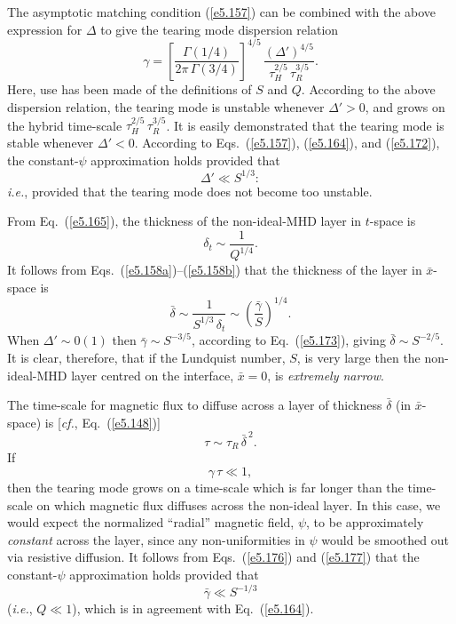 The asymptotic matching condition (\ref{e5.157}) can be combined with the above
expression for ${\Delta}$ to give the tearing mode dispersion relation
\begin{equation}\label{e5.173}
\gamma = \left[\frac{{\Gamma}(1/4)}{2\pi\,{\Gamma}(3/4)}\right]^{4/5}\,
\frac{({\Delta}')^{4/5}}{\tau_H^{2/5}\,\tau_R^{3/5}}.
\end{equation}
Here, use has been made of the definitions of $S$ and $Q$. According
to the above dispersion relation, the tearing mode is unstable whenever ${\Delta}'>0$, and grows on the hybrid time-scale $\tau_H^{2/5}\,\tau_R^{3/5}$. 
It is easily demonstrated that the tearing mode is stable whenever ${\Delta}'<0$.
According to Eqs.~(\ref{e5.157}), (\ref{e5.164}), and (\ref{e5.172}), the constant-$\psi$
approximation holds provided that
\begin{equation}
{\Delta}' \ll S^{1/3}:
\end{equation}
{\em i.e.}, provided that the tearing mode does not become too
unstable.

From  Eq.~(\ref{e5.165}), the thickness of the non-ideal-MHD layer in $t$-space
is
\begin{equation}
\delta_t \sim \frac{1}{Q^{1/4}}.
\end{equation}
It follows from Eqs.~(\ref{e5.158a})--(\ref{e5.158b}) that the thickness of the layer in $\bar{x}$-space
is
\begin{equation}\label{e5.176}
\bar{\delta} \sim \frac{1}{S^{1/3}\,\delta_t} \sim \left(
\frac{\bar{\gamma}}{S}\right)^{1/4}.
\end{equation}
When ${\Delta}'\sim 0(1)$ then $\bar{\gamma}\sim S^{-3/5}$, according to
Eq.~(\ref{e5.173}), giving $\bar{\delta}\sim S^{-2/5}$. It is clear, therefore, that if
the Lundquist number, $S$, is very large then the non-ideal-MHD layer centred
on the interface, $\bar{x}=0$,  is {\em extremely narrow}.

The time-scale for magnetic flux to diffuse across a layer of thickness
$\bar{\delta}$ (in $\bar{x}$-space) is [{\em cf.}, Eq.~(\ref{e5.148})]
\begin{equation}\label{e5.177}
\tau \sim \tau_R\,\bar{\delta}^{~2}.
\end{equation}
If 
\begin{equation}
\gamma\,\tau\ll 1,
\end{equation}
then the tearing mode grows on a time-scale which is far longer than the
time-scale on which magnetic flux diffuses across the non-ideal layer. In this case,
we would expect the normalized ``radial'' magnetic field, $\psi$, to be approximately
{\em constant} across the layer, since any non-uniformities in $\psi$ would be
smoothed out via resistive diffusion. It follows from Eqs.~(\ref{e5.176}) and (\ref{e5.177})
that the constant-$\psi$ approximation holds provided that
\begin{equation}
\bar{\gamma} \ll S^{-1/3}
\end{equation}
({\em i.e.}, $Q\ll 1$), which is in agreement with Eq.~(\ref{e5.164}).

